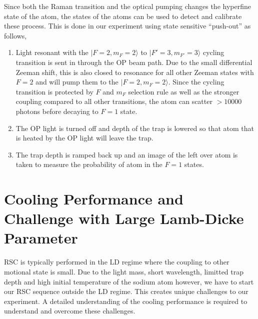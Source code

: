 Since both the Raman transition and the optical pumping changes the hyperfine state of the atom,
the states of the atoms can be used to detect and calibrate these process.
This is done in our experiment using state sensitive ``push-out'' as follows,
\begin{enumerate}
\item Light resonant with the $|F=2,m_F=2\rangle$ to $|F'=3,m_{F'}=3\rangle$ cycling transition
  is sent in through the OP beam path.
  Due to the small differential Zeeman shift, this is also closed to resonance
  for all other Zeeman states with $F=2$ and will pump them to the $|F=2,m_F=2\rangle$.
  Since the cycling transition is protected by $F$ and $m_F$ selection rule
  as well as the stronger coupling compared to all other transitions,
  the atom can scatter $>\!10000$ photons before decaying to $F=1$ state.
\item The OP light is turned off and depth of the trap is lowered so that
  atom that is heated by the OP light will leave the trap.
\item The trap depth is ramped back up and an image of the left over atom
  is taken to measure the probability of atom in the $F=1$ states.
\end{enumerate}

\section{Cooling Performance and Challenge with Large Lamb-Dicke Parameter}
\label{ch:rsc:challenges}

RSC is typically performed in the LD regime where the coupling
to other motional state is small.
Due to the light mass, short wavelength, limitted trap depth and high initial temperature
of the sodium atom however, we have to start our RSC sequence outside the LD regime.
This creates unique challenges to our experiment.
A detailed understanding of the cooling performance is required to understand
and overcome these challenges.


